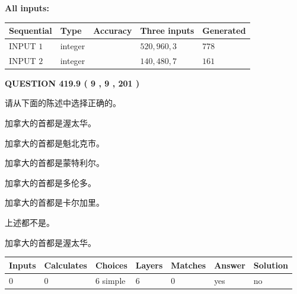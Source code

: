 \documentclass{ctexart}
\begin{document}
   
   
   
\noindent\vspace{0.1in}\hspace{-0.08in} {\textbf{\Large{All inputs: }}}
   
   
  
  
\noindent\begin{tabular}{|l|l|l|l|l|}
\hline
 Sequential & Type & Accuracy & Three inputs & Generated \\ 
\hline
 
 
  INPUT $  1 $ & integer &  & $
 520
 , 
 960
 , 
 3
 $ & $ 778 $ 
 \\  \hline  
 
 
  INPUT $  2 $ & integer &  & $
 140
 , 
 480
 , 
 7
 $ & $ 161 $ 
 \\  \hline  
 \end{tabular}
   
   
  
\vspace{0.2in}
  
{\textbf{\Large{QUESTION
419.9 
 ( 9 , 9 , 201 )
}}}
  
  
请从下面的陈述中选择正确的。
 
 
加拿大的首都是渥太华。
 
 
加拿大的首都是魁北克市。
 
 
加拿大的首都是蒙特利尔。
 
 
加拿大的首都是多伦多。
 
 
加拿大的首都是卡尔加里。
 
 
 上述都不是。
 
 
\noindent{}
 
 
加拿大的首都是渥太华。
 
 
\noindent{}
 
 
   
   
   
   
\noindent\begin{tabular}{|l|l|l|l|l|l|l|}
 \hline
Inputs & Calculates & Choices & Layers & Matches & Answer & Solution \\ \hline
 0  & 
 0  & 
 6
  simple  
  & 
 6  & 
 0  & 
  yes & 
  no 
  \\ \hline
 \end{tabular}
   
\end{document}
